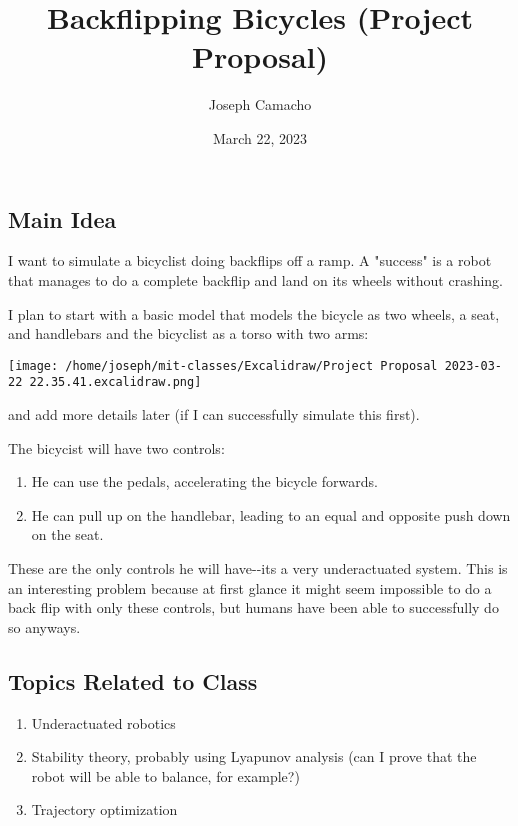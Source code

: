 \documentclass[
]{article}
\title{Backflipping Bicycles (Project Proposal)}
\author{Joseph Camacho}
\date{March 22, 2023}
\providecommand{\tightlist}{%
  \setlength{\itemsep}{0pt}\setlength{\parskip}{0pt}}
\begin{document}
\maketitle

\hypertarget{main-idea}{%
\subsection{Main Idea}\label{main-idea}}

I want to simulate a bicyclist doing backflips off a ramp. A "success"
is a robot that manages to do a complete backflip and land on its wheels
without crashing.

I plan to start with a basic model that models the bicycle as two
wheels, a seat, and handlebars and the bicyclist as a torso with two
arms:\\
\begin{center}
\texttt{[image: /home/joseph/mit-classes/Excalidraw/Project Proposal 2023-03-22 22.35.41.excalidraw.png]}\\
\end{center}
and add more details later (if I can successfully simulate this first).

The bicycist will have two controls:
\begin{enumerate}
\tightlist
\item
  He can use the pedals, accelerating the bicycle forwards.
\item
  He can pull up on the handlebar, leading to an equal and opposite push
  down on the seat.
\end{enumerate}
These are the only controls he will have-\/-it\textquotesingle s a
very underactuated system.  This is an interesting problem because at first glance it might seem impossible to do a back flip with only these controls, but humans have been able to successfully do so anyways.

\hypertarget{topics-related-to-class}{%
\subsection{Topics Related to Class}\label{topics-related-to-class}}

\begin{enumerate}
\tightlist
\item
  Underactuated robotics
\item
  Stability theory, probably using Lyapunov analysis (can I prove that
  the robot will be able to balance, for example?)
\item
  Trajectory optimization
\end{enumerate}
\end{document}
